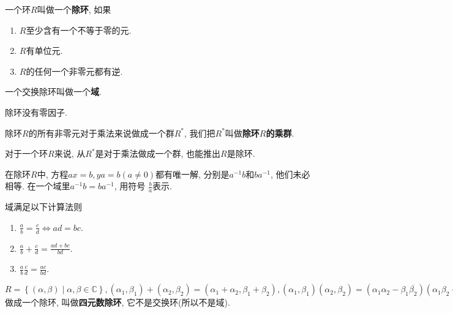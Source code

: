 \begin{Definition}[除环]
一个环$R$叫做一个\textbf{除环}, 如果
\begin{enumerate}
	\item $R$至少含有一个不等于零的元.
	\item $R$有单位元.
	\item $R$的任何一个非零元都有逆.
\end{enumerate}
\end{Definition}

\begin{Definition}[域]
一个交换除环叫做一个\textbf{域}.
\end{Definition}

\begin{Property}
除环没有零因子.
\end{Property}

\begin{Property}
除环$R$的所有非零元对于乘法来说做成一个群$R^*$, 我们把$R^*$叫做\textbf{除环$R$的乘群}.
\end{Property}

\begin{Note}
对于一个环$R$来说, 从$R^*$是对于乘法做成一个群, 也能推出$R$是除环.
\end{Note}

\begin{Note}
在除环$R$中, 方程$ax = b, ya = b (a \neq \mathfrak{0})$都有唯一解, 分别是$a^{-1}b$和$ba^{-1}$, 他们未必相等. 在一个域里$a^{-1}b = ba^{-1}$, 用符号
$\displaystyle \frac{b}{a}$表示.
\end{Note}

\begin{Property}
域满足以下计算法则
\begin{enumerate}
	\item $\displaystyle \frac{a}{b} = \frac{c}{d} \Leftrightarrow ad = bc$.
	\item $\displaystyle \frac{a}{b} + \frac{c}{d} = \frac{ad + bc}{bd}$.
	\item $\displaystyle \frac{a}{b} \frac{c}{d} = \frac{ac}{bd}$.
\end{enumerate}
\end{Property}

\begin{Proposition}
$R = 
\left\{ (\alpha, \beta) \mid \alpha, \beta \in \mathbb{C} \right\}, 
(\alpha_1, \beta_1) + (\alpha_2, \beta_2) = 
	(\alpha_1 + \alpha_2, \beta_1 + \beta_2), 
(\alpha_1, \beta_1)(\alpha_2, \beta_2) = 
	(\alpha_1 \alpha_2 - \beta_1 \overline{\beta_2})
	(\alpha_1 \beta_2 + \beta_1 \overline{\alpha_2})
$ 做成一个除环, 叫做\textbf{四元数除环}, 它不是交换环(所以不是域).
\end{Proposition}

